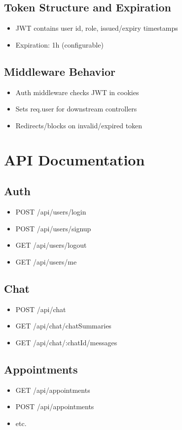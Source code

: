 \documentclass{article}
\begin{document}
\subsection{Token Structure and Expiration}
\begin{itemize}
  \item JWT contains user id, role, issued/expiry timestamps
  \item Expiration: 1h (configurable)
\end{itemize}

\subsection{Middleware Behavior}
\begin{itemize}
  \item Auth middleware checks JWT in cookies
  \item Sets req.user for downstream controllers
  \item Redirects/blocks on invalid/expired token
\end{itemize}

\section{API Documentation}
\subsection{Auth}
\begin{itemize}
  \item POST /api/users/login
  \item POST /api/users/signup
  \item GET /api/users/logout
  \item GET /api/users/me
\end{itemize}

\subsection{Chat}
\begin{itemize}
  \item POST /api/chat
  \item GET /api/chat/chatSummaries
  \item GET /api/chat/:chatId/messages
\end{itemize}

\subsection{Appointments}
\begin{itemize}
  \item GET /api/appointments
  \item POST /api/appointments
  \item etc.
\end{itemize}
\end{document}

